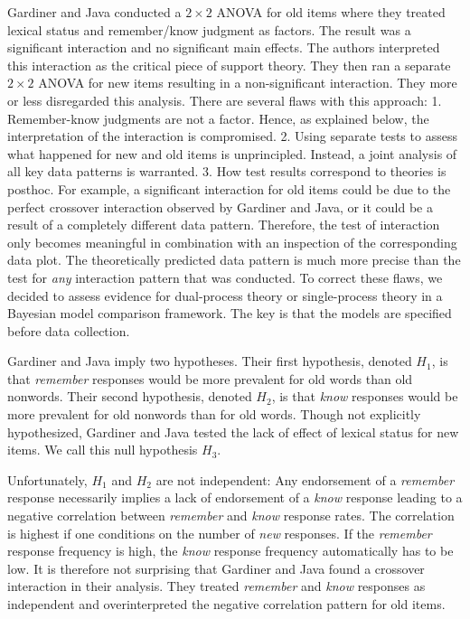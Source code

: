 \documentclass[english,,man,floatsintext]{apa6}
\begin{document}
Gardiner and Java conducted a \(2\times 2\) ANOVA for old items where they treated lexical status and remember/know judgment as factors. The result was a significant interaction and no significant main effects. The authors interpreted this interaction as the critical piece of support theory. They then ran a separate \(2\times 2\) ANOVA for new items resulting in a non-significant interaction. They more or less disregarded this analysis.
There are several flaws with this approach: 1. Remember-know judgments are not a factor. Hence, as explained below, the interpretation of the interaction is compromised. 2. Using separate tests to assess what happened for new and old items is unprincipled. Instead, a joint analysis of all key data patterns is warranted. 3. How test results correspond to theories is posthoc. For example, a significant interaction for old items could be due to the perfect crossover interaction observed by Gardiner and Java, or it could be a result of a completely different data pattern. Therefore, the test of interaction only becomes meaningful in combination with an inspection of the corresponding data plot. The theoretically predicted data pattern is much more precise than the test for \emph{any} interaction pattern that was conducted. To correct these flaws, we decided to assess evidence for dual-process theory or single-process theory in a Bayesian model comparison framework. The key is that the models are specified before data collection.

Gardiner and Java imply two hypotheses. Their first hypothesis, denoted \(H_1\), is that \emph{remember} responses would be more prevalent for old words than old nonwords. Their second hypothesis, denoted \(H_2\), is that \emph{know} responses would be more prevalent for old nonwords than for old words. Though not explicitly hypothesized, Gardiner and Java tested the lack of effect of lexical status for new items. We call this null hypothesis \(H_3\).

Unfortunately, \(H_1\) and \(H_2\) are not independent: Any endorsement of a \emph{remember} response necessarily implies a lack of endorsement of a \emph{know} response leading to a negative correlation between \emph{remember} and \emph{know} response rates. The correlation is highest if one conditions on the number of \emph{new} responses. If the \emph{remember} response frequency is high, the \emph{know} response frequency automatically has to be low. It is therefore not surprising that Gardiner and Java found a crossover interaction in their analysis. They treated \emph{remember} and \emph{know} responses as independent and overinterpreted the negative correlation pattern for old items.
\end{document}
